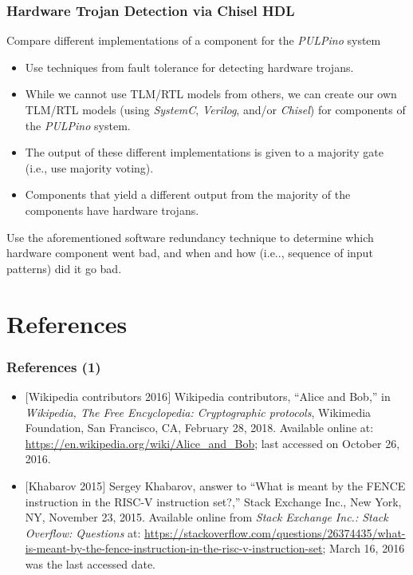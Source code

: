 \documentclass[xcolor={usenames,dvipsnames},hyperref={hyperindex,bookmarks}]{beamer}
\begin{document}
\frame
{
	\frametitle{Hardware Trojan Detection via Chisel HDL}

	Compare different implementations of a component for the {\it PULPino} system
	\begin{itemize}
	\item Use techniques from fault tolerance for detecting hardware trojans. 
	\item While we cannot use TLM/RTL models from others, we can create our own TLM/RTL models (using {\it SystemC}, {\it Verilog}, and/or {\it Chisel}) for components of the {\it PULPino} system.
	\item The output of these different implementations is given to a majority gate (i.e., use majority voting).
	\item Components that yield a different output from the majority of the components have hardware trojans.
	\end{itemize}
	Use the aforementioned software redundancy technique to determine which hardware component went bad, and when and how (i.e.., sequence of input patterns) did it go bad.
}













\section{References}

\frame
{
	\frametitle{References (1)}

	\begin{itemize}
	\item $[$Wikipedia contributors 2016$]$ Wikipedia contributors, ``Alice and Bob,'' in {\it Wikipedia, The Free Encyclopedia: Cryptographic protocols}, Wikimedia Foundation, San Francisco, CA, February 28, 2018. Available online at: \url{https://en.wikipedia.org/wiki/Alice_and_Bob}; last accessed on October 26, 2016.
	\item $[$Khabarov 2015$]$ Sergey Khabarov, answer to ``What is meant by the FENCE instruction in the RISC-V instruction set?,'' Stack Exchange Inc., New York, NY, November 23, 2015. Available online from {\it Stack Exchange Inc.: Stack Overflow: Questions} at: \url{https://stackoverflow.com/questions/26374435/what-is-meant-by-the-fence-instruction-in-the-risc-v-instruction-set}; March 16, 2016 was the last accessed date.
	\end{itemize}
}
\end{document}
